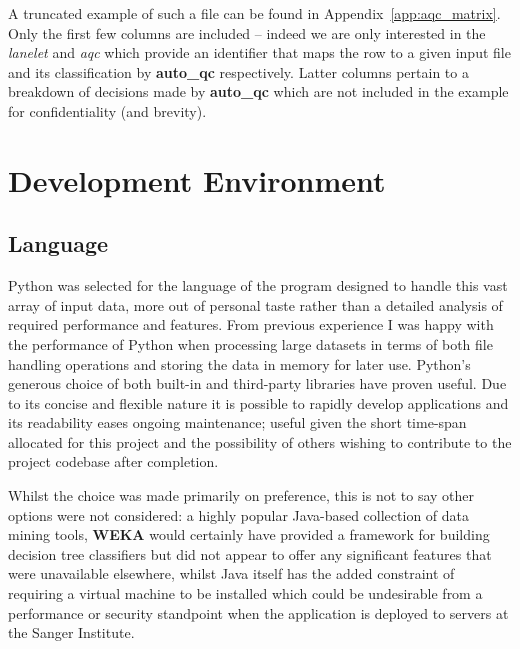 A truncated example of such a file can be found in Appendix~\ref{app:aqc_matrix}.
Only the first few columns are included -- indeed we are only interested in the
\textit{lanelet} and \textit{aqc} which provide an identifier that maps the row
to a given input file and its classification by \textbf{auto\_qc} respectively.
Latter columns pertain to a breakdown of decisions made by \textbf{auto\_qc}
which are not included in the example for confidentiality (and brevity).


\section{Development Environment}
\subsection{Language}
Python was selected for the language of the program designed to handle this vast
array of input data, more out of personal taste rather than a detailed analysis
of required performance and features. From previous experience I was happy with
the performance of Python when processing large datasets in terms of both
file handling operations and storing the data in memory for later use. Python's
generous choice of both built-in and third-party libraries have proven useful.
Due to its concise and flexible nature it is possible to rapidly
develop applications and its readability eases ongoing maintenance; useful given
the short time-span allocated for this project and the possibility of others
wishing to contribute to the project codebase after completion.

Whilst the choice was made primarily on preference, this is not to say other
options were not considered: a highly popular Java-based collection of data
mining tools, \textbf{WEKA}\citep{weka} would certainly have provided a
framework for building decision tree classifiers but did not
appear to offer any significant features that were unavailable elsewhere, whilst
Java itself has the added constraint of requiring a virtual machine to be
installed which could be undesirable from a performance or security
standpoint when the application is deployed to servers at the Sanger Institute.


